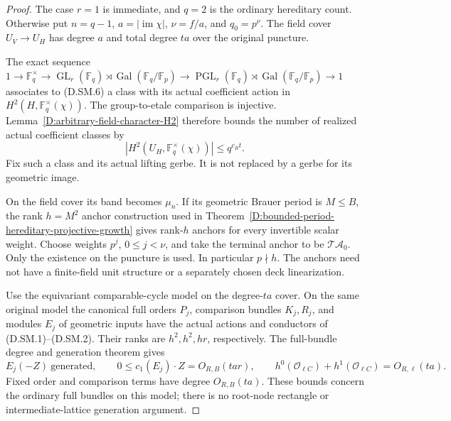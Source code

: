 \begin{proof}
The case $r=1$ is immediate, and $q=2$ is the ordinary
hereditary count. Otherwise put $n=q-1$,
$a=|\operatorname{im}\chi|$, $\nu=f/a$, and $q_0=p^\nu$.
The field cover $U_V\to U_H$ has degree $a$ and total
degree $ta$ over the original puncture.

The exact sequence
$1\to\mathbb F_q^\times\to\operatorname{GL}_r(\mathbb F_q)
\rtimes\operatorname{Gal}(\mathbb F_q/\mathbb F_p)
\to\operatorname{PGL}_r(\mathbb F_q)
\rtimes\operatorname{Gal}(\mathbb F_q/\mathbb F_p)\to1$
associates to (D.SM.6) a class with its actual coefficient
action in $H^2(H,\mathbb F_q^\times(\chi))$.
The group-to-etale comparison is injective.
Lemma~\ref{D:arbitrary-field-character-H2} therefore
bounds the number of realized actual coefficient classes by
\[
                 |H^2(U_H,\mathbb F_q^\times(\chi))|
                                  \le q^{c_Rt}.        \tag{D.SM.7}
\]
Fix such a class and its actual lifting gerbe.
It is not replaced by a gerbe for its geometric image.

On the field cover its band becomes $\mu_n$.
If its geometric Brauer period is $M\le B$, the rank
$h=M^2$ anchor construction used in
Theorem~\ref{D:bounded-period-hereditary-projective-growth}
gives rank-$h$ anchors for every invertible scalar
weight. Choose weights $p^j$, $0\le j<\nu$, and take
the terminal anchor to be $\mathscr T\mathcal A_0$.
Only the existence on the puncture is used.
In particular $p\nmid h$. The anchors need not have
a finite-field unit structure or a separately chosen
deck linearization.

Use the equivariant comparable-cycle model on the
degree-$ta$ cover. On the same original model the
canonical full orders $P_j$, comparison bundles
$K_j,R_j$, and modules $E_j$ of geometric inputs have
the actual actions and conductors of (D.SM.1)--(D.SM.2).
Their ranks are $h^2,h^2,hr$, respectively.
The full-bundle degree and generation theorem gives
\[
 E_j(-Z)\ \text{generated},\qquad
 0\le c_1(E_j)\cdot Z=O_{R,B}(ta r),\qquad
 h^0(\mathcal O_{\ell C})+h^1(\mathcal O_{\ell C})
                                      =O_{R,\ell}(ta).
                                                        \tag{D.SM.8}
\]
Fixed order and comparison terms have degree
$O_{R,B}(ta)$. These bounds concern the ordinary
full bundles on this model; there is no root-node
rectangle or intermediate-lattice generation argument.


\end{proof}
